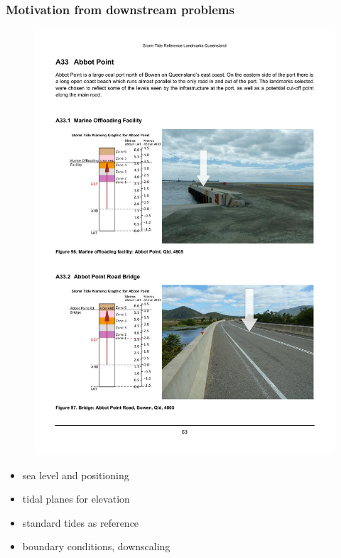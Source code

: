 \begin{frame}
\begin{minipage}{0.4\textwidth}
\begin{figure}
    \end{figure} 
\end{minipage}

\end{frame}
\begin{frame}
\frametitle{Motivation from downstream problems}
\begin{minipage}{0.35\textwidth}
    \begin{figure}      
    \includegraphics[trim={2cm 0 5cm 5cm},clip,height=0.7\textheight]{figures/images/qldLandmarkEg.pdf}
    \end{figure}
\end{minipage}
\begin{minipage}{0.6\textwidth} 
  \begin{itemize}
      \item sea level and positioning
      \item tidal planes for elevation
      \item standard tides as reference
      \item boundary conditions, downscaling
  \end{itemize}
\end{minipage}
\end{frame}

